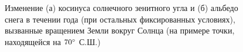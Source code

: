 \documentclass[a4paper, fontsize=14pt]{scrartcl}
\begin{document}
\begin{figure}[h]
    \begin{minipage}[h]{0.49\linewidth}
    \end{minipage}
    \hfill
    \begin{minipage}[h]{0.49\linewidth}
    \end{minipage}
    \caption{Изменение (а) косинуса солнечного зенитного угла и (б) альбедо снега в течении года (при остальных фиксированных условиях), вызванные вращением Земли вокруг Солнца (на примере точки, находящейся на $70\degree$ С.Ш.)}
    \label{fig:image}
\end{figure}
\end{document}
